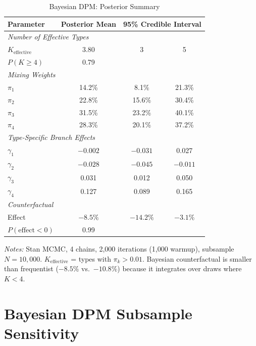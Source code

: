\documentclass[12pt]{article}
\begin{document}
\begin{table}[H]
\centering
\caption{Bayesian DPM: Posterior Summary}
\label{tab:bayesian}
\begin{threeparttable}
\begin{tabular}{lccc}
\toprule
Parameter & Posterior Mean & \multicolumn{2}{c}{95\% Credible Interval} \\
\midrule
\multicolumn{4}{l}{\textit{Number of Effective Types}} \\
$K_{\text{effective}}$ & 3.80 & 3 & 5 \\
$P(K \geq 4)$ & 0.79 & & \\
[4pt]
\multicolumn{4}{l}{\textit{Mixing Weights}} \\
$\pi_1$ & 14.2\% & 8.1\% & 21.3\% \\
$\pi_2$ & 22.8\% & 15.6\% & 30.4\% \\
$\pi_3$ & 31.5\% & 23.2\% & 40.1\% \\
$\pi_4$ & 28.3\% & 20.1\% & 37.2\% \\
[4pt]
\multicolumn{4}{l}{\textit{Type-Specific Branch Effects}} \\
$\gamma_1$ & $-0.002$ & $-0.031$ & 0.027 \\
$\gamma_2$ & $-0.028$ & $-0.045$ & $-0.011$ \\
$\gamma_3$ & 0.031 & 0.012 & 0.050 \\
$\gamma_4$ & 0.127 & 0.089 & 0.165 \\
[4pt]
\multicolumn{4}{l}{\textit{Counterfactual}} \\
Effect & $-8.5\%$ & $-14.2\%$ & $-3.1\%$ \\
$P(\text{effect} < 0)$ & 0.99 & & \\
\bottomrule
\end{tabular}
\begin{tablenotes}
\small
\item \textit{Notes:} Stan MCMC, 4 chains, 2,000 iterations (1,000 warmup), subsample $N = 10{,}000$. $K_{\text{effective}}$ = types with $\pi_k > 0.01$. Bayesian counterfactual is smaller than frequentist ($-8.5\%$ vs.\ $-10.8\%$) because it integrates over draws where $K < 4$.
\end{tablenotes}
\end{threeparttable}
\end{table}


\section{Bayesian DPM Subsample Sensitivity}
\label{app:dpm_sensitivity}
\end{document}
